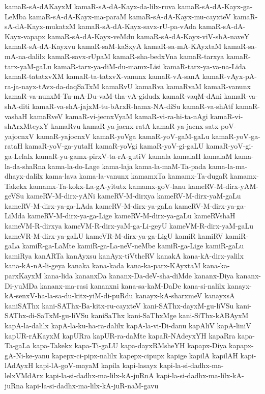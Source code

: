 {kamaR-sA-dAKayxM
kamaR-sA-dA-Kayx-da-lilx-ruva
kamaR-sA-dA-Kayx-ga-LeMba
kamaR-sA-dA-Kayx-ma-paraM
kamaR-sA-dA-Kayx-mu-cayxteV
kamaR-sA-dA-Kayx-mukatxM
kamaR-sA-dA-Kayx-savx-rU-pa-vAda
kamaR-sA-dA-Kayx-vapapx
kamaR-sA-dA-Kayx-veMdu
kamaR-sA-dA-Kayx-viV-shA-naveY
kamaR-sA-dA-Kayxvu
kamaR-saM-kaSxyA
kamaR-sa-mA-KAyxtaM
kamaR-sa-mA-na-dalilx
kamaR-savx-rUpaM
kamaR-sha-bedxVna
kamaR-tarxya
kamaR-tarx-yaM-gaLu
kamaR-tarx-ya-diM-du-mamx-Lisi
kamaR-tarx-ya-va-na-Lida
kamaR-tatatxvXM
kamaR-ta-tatxvX-vanunx
kamaR-vA-sanA
kamaR-vAyx-pA-ra-ja-nayx-tAvx-da-daqSaTxM
kamaRvU
kamaRva
kamaRvaM
kamaR-vanunx
kamaR-va-nunxM-Tu-mA-Du-vaM-tha-vA-gidudx
kamaR-vaqM-dAni
kamaR-va-shA-diti
kamaR-va-shA-jajxM-tu-bArxR-hamx-NA-diSu
kamaR-va-shAtf
kamaR-vashaH
kamaRveV
kamaR-vi-jecnxVyaM
kamaR-vi-ra-hi-ta-nAgi
kamaR-vi-shArxMteyxY
kamaRvu
kamaR-ya-jacnx-ratA
kamaR-ya-jacnx-satx-poV-yajocnxV
kamaR-yajocnxV
kamaR-yoVga
kamaR-yoV-gaM-gaLu
kamaR-yoV-ga-rataH
kamaR-yoV-ga-yutaH
kamaR-yoVgi
kamaR-yoV-gi-gaLU
kamaR-yoV-gi-ga-Lelalx
kamaR-yu-gamx-pirxV-ta-rA-gutiV
kamala
kamalaH
kamalaM
kama-la-da-shaRna
kama-la-do-Lage
kama-laja
kama-la-maM-Ta-pada
kama-la-ma-dhayx-dalilx
kama-lava
kama-la-vanunx
kamamxTa
kamamx-Ta-dugaR
kamamx-Takekx
kamamx-Ta-kokx-La-gA-yitutx
kamamx-goV-lanu
kameRV-M-dirx-yAM-geVSu
kameRV-M-dirx-yANi
kameRV-M-dirxya
kameRV-M-dirx-yaM-gaLu
kameRV-M-dirx-ya-ga-LAda
kameRV-M-dirx-ya-gaLa
kameRV-M-dirx-ya-ga-LiMda
kameRV-M-dirx-ya-ga-Lige
kameRV-M-dirx-ya-gaLu
kameRVshaH
kameVM-R-dirxya
kameVM-R-dirx-yaM-ga-Li-geyU
kameVM-R-dirx-yaM-gaLu
kameVR-M-dirx-ya-gaLU
kameVR-M-dirx-ya-ga-LigU
kamiR
kamiRV
kamiR-gaLa
kamiR-ga-LaMte
kamiR-ga-La-neV-neMbe
kamiR-ga-Lige
kamiR-gaLu
kamiRya
kanARTa
kanAyxsu
kanAyx-tiVtheRV
kanakA
kana-kA-dirx-yalilx
kana-kA-nA-li-geya
kanaka
kana-kada
kana-ka-parx-KAyxtaM
kana-ka-parxKayxM
kana-lida
kananxDa
kananx-Da-deV-sha-diMde
kananx-Diya
kananx-Di-yuMDa
kananx-ma-rasi
kananxni
kana-sa-kaM-DaDe
kana-si-nalilx
kanayx-kA-senxV-ha-la-sa-du-kitx-yiM-di-puRdu
kanayx-kA-sharxmeV
kanayxsA
kaniSAThx
kani-SAThx-Ba-kitx-ru-cayxteV
kani-SAThx-dayxM-gu-liVSu
kani-SAThx-di-SaTxM-gu-liVSu
kaniSaThx
kani-SaThxMge
kani-SiThx-kABAyxM
kapA-la-dalilx
kapA-la-ku-ha-ra-dalilx
kapA-la-vi-Di-danu
kapAliV
kapA-liniV
kapUR-rAKayxM
kapURra
kapUR-ra-daMte
kapaR-NAdeyxYH
kapaRra
kapa-Ta-gaLa
kapa-Takekx
kapa-Ti-gaLU
kapa-dayxRMsheYH
kapapx-Diya
kapapx-gA-Ni-ke-yanu
kapepx-ci-pipx-nalilx
kapepx-cipupx
kapige
kapilA
kapilAH
kapi-lAdAyxH
kapi-lA-goV-mayaM
kapila
kapi-lasayx
kapi-la-si-dadhx-ma-lelxVMdArx
kapi-la-si-dadhx-ma-lilx-kA-juRnA
kapi-la-si-dadhx-ma-lilx-kA-juRna
kapi-la-si-dadhx-ma-lilx-kA-juR-naM-gavu
}

